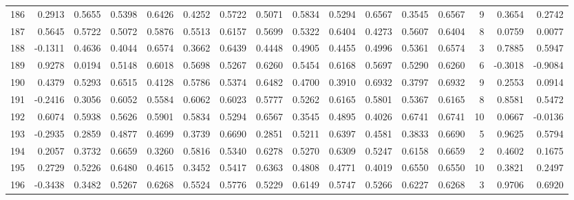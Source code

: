 \begin{tabular}{lrrrrrrrrrrrrrrr}
186 &      0.2913 &  0.5655 &  0.5398 &  0.6426 &  0.4252 &  0.5722 &  0.5071 &  0.5834 &  0.5294 &  0.6567 &   0.3545 &     0.6567 &      9 &                    0.3654 &                     0.2742 \\
187 &      0.5645 &  0.5722 &  0.5072 &  0.5876 &  0.5513 &  0.6157 &  0.5699 &  0.5322 &  0.6404 &  0.4273 &   0.5607 &     0.6404 &      8 &                    0.0759 &                     0.0077 \\
188 &     -0.1311 &  0.4636 &  0.4044 &  0.6574 &  0.3662 &  0.6439 &  0.4448 &  0.4905 &  0.4455 &  0.4996 &   0.5361 &     0.6574 &      3 &                    0.7885 &                     0.5947 \\
189 &      0.9278 &  0.0194 &  0.5148 &  0.6018 &  0.5698 &  0.5267 &  0.6260 &  0.5454 &  0.6168 &  0.5697 &   0.5290 &     0.6260 &      6 &                   -0.3018 &                    -0.9084 \\
190 &      0.4379 &  0.5293 &  0.6515 &  0.4128 &  0.5786 &  0.5374 &  0.6482 &  0.4700 &  0.3910 &  0.6932 &   0.3797 &     0.6932 &      9 &                    0.2553 &                     0.0914 \\
191 &     -0.2416 &  0.3056 &  0.6052 &  0.5584 &  0.6062 &  0.6023 &  0.5777 &  0.5262 &  0.6165 &  0.5801 &   0.5367 &     0.6165 &      8 &                    0.8581 &                     0.5472 \\
192 &      0.6074 &  0.5938 &  0.5626 &  0.5901 &  0.5834 &  0.5294 &  0.6567 &  0.3545 &  0.4895 &  0.4026 &   0.6741 &     0.6741 &     10 &                    0.0667 &                    -0.0136 \\
193 &     -0.2935 &  0.2859 &  0.4877 &  0.4699 &  0.3739 &  0.6690 &  0.2851 &  0.5211 &  0.6397 &  0.4581 &   0.3833 &     0.6690 &      5 &                    0.9625 &                     0.5794 \\
194 &      0.2057 &  0.3732 &  0.6659 &  0.3260 &  0.5816 &  0.5340 &  0.6278 &  0.5270 &  0.6309 &  0.5247 &   0.6158 &     0.6659 &      2 &                    0.4602 &                     0.1675 \\
195 &      0.2729 &  0.5226 &  0.6480 &  0.4615 &  0.3452 &  0.5417 &  0.6363 &  0.4808 &  0.4771 &  0.4019 &   0.6550 &     0.6550 &     10 &                    0.3821 &                     0.2497 \\
196 &     -0.3438 &  0.3482 &  0.5267 &  0.6268 &  0.5524 &  0.5776 &  0.5229 &  0.6149 &  0.5747 &  0.5266 &   0.6227 &     0.6268 &      3 &                    0.9706 &                     0.6920 \\

\end{tabular}
